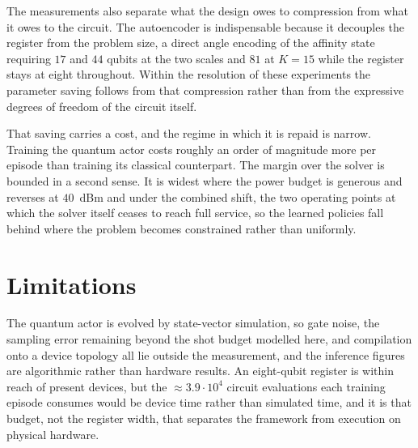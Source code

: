 \documentclass[12pt,onecolumn]{IEEEtran}
\newif\iffull
\begin{document}
The measurements also separate what the design owes to compression from what it owes to the
circuit. The autoencoder is indispensable because it decouples the register from the problem
size, a direct angle encoding of the affinity state requiring $17$ and $44$ qubits at the two
scales and $81$ at $K{=}15$ while the register stays at eight throughout. Within the
resolution of these experiments the parameter saving follows from that compression rather
than from the expressive degrees of freedom of the circuit itself. \iffull
Three measurements delimit that statement. Reducing the
register from eight qubits to six, and measuring eight single-qubit $Z$ observables in place
of the $26$ of the structured readout, each leave the sum-rate inside the seed
spread, as does removing the entangling bridges at a fixed parameter count
(Section~\ref{sec:results_quantum}). We report this as a negative result about the circuit
rather than about the framework. It locates the parameter saving in how the state is
compressed for the register rather than in the correlations the register is able to
represent, and it suggests that the assignment problem at these scales is not one whose
structure a shallow entangling ansatz exploits.
\fi

That saving carries a cost, and the regime in which it is repaid is narrow. Training the
quantum actor costs roughly an order of magnitude more per episode than training its
classical counterpart. The
margin over the solver is bounded in a second sense. It is widest where the power budget is
generous and reverses at $40$~dBm and under the combined shift, the two operating points at
which the solver itself ceases to reach full service, so the learned policies fall behind
where the problem becomes constrained rather than uniformly.

\section{Limitations}
\label{sec:limitations}

The quantum actor is evolved by state-vector simulation, so gate noise, the
sampling error remaining beyond the shot budget modelled here, and compilation
onto a device topology all lie outside the measurement, and the inference figures
are algorithmic rather than hardware results. An eight-qubit register is within
reach of present devices, but the ${\approx}3.9{\cdot}10^{4}$ circuit evaluations
each training episode consumes would be device time rather than simulated time,
and it is that budget, not the register width, that separates the framework from
execution on physical hardware.
\end{document}
